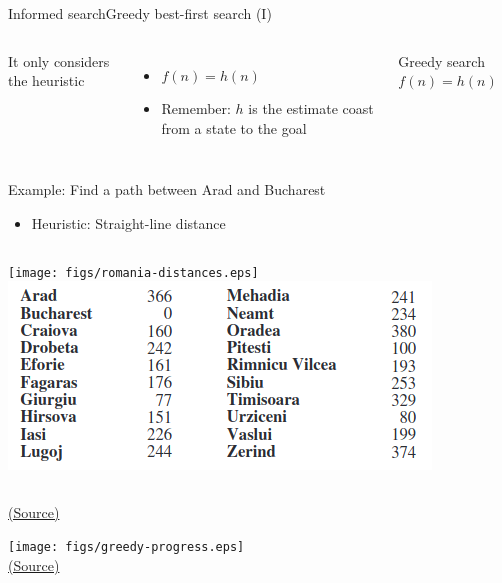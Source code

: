 \documentclass[10pt,compress]{beamer} %
\begin{document}
\begin{frame}{Informed search}{Greedy best-first search (I)}
    \begin{columns}
            It only considers the heuristic
            \begin{itemize}
                \item $f(n) = h(n)$
                \item  Remember: $h$ is the estimate coast from a state to the goal
            \end{itemize}

            \begin{block}{Greedy search}
                $f(n) = h (n)$
            \end{block}
    \end{columns}
    
    \bigskip

    Example: Find a path between Arad and Bucharest
    \begin{itemize}
        \item Heuristic: Straight-line distance
    \end{itemize}

    \begin{columns}[c]
        \texttt{[image: figs/romania-distances.eps]}
        \includegraphics[width=\linewidth]{figs/distances.png}\\
    \end{columns}

    \centering \tiny{\href{http://aima.cs.berkeley.edu/index.html}{(Source)}}
\end{frame}

\begin{frame}
      \begin{center}
          \texttt{[image: figs/greedy-progress.eps]}\\
          \tiny{\href{http://aima.cs.berkeley.edu/index.html}{(Source)}}
      \end{center}
\end{frame}
\end{document}
